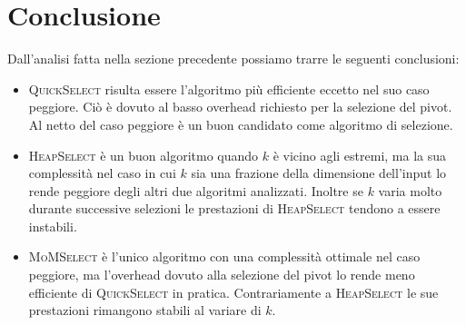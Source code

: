 \documentclass[a4paper,12pt]{article}
\newcommand{\QuickSelect}{\textsc{QuickSelect}}
\newcommand{\HeapSelect}{\textsc{HeapSelect}}
\newcommand{\MoMSelect}{\textsc{MoMSelect}}
\begin{document}
\section{Conclusione}
Dall'analisi fatta nella sezione precedente possiamo trarre le seguenti conclusioni:
\begin{itemize}
	\item \QuickSelect{} risulta essere l'algoritmo più efficiente eccetto nel suo caso peggiore.
		Ciò è dovuto al basso overhead richiesto per la selezione del pivot.
		Al netto del caso peggiore è un buon candidato come algoritmo di selezione.
	\item \HeapSelect{} è un buon algoritmo quando $k$ è vicino agli estremi, ma la sua complessità nel caso in cui $k$ sia una frazione della dimensione dell'input lo rende peggiore degli altri due algoritmi analizzati.
		Inoltre se $k$ varia molto durante successive selezioni le prestazioni di \HeapSelect{} tendono a essere instabili.
	\item \MoMSelect{} è l'unico algoritmo con una complessità ottimale nel caso peggiore, ma l'overhead dovuto alla selezione del pivot lo rende meno efficiente di \QuickSelect{} in pratica.
		Contrariamente a \HeapSelect{} le sue prestazioni rimangono stabili al variare di $k$.
\end{itemize}
\end{document}
